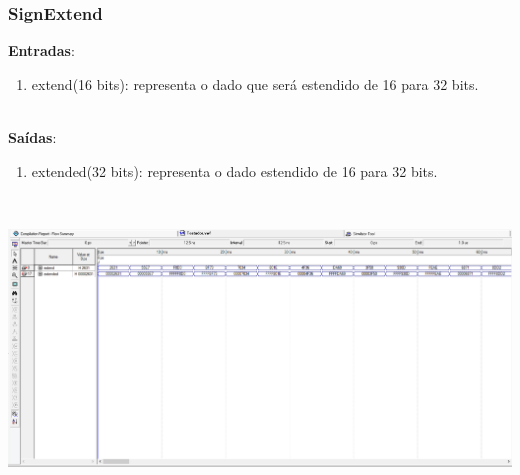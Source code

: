 \documentclass{article}
\begin{document}
    \subsubsection{SignExtend}
    \textbf{Entradas}:
    \begin{enumerate}
         \item extend(16 bits): representa o dado que será estendido de 16 para 32 bits.\\
    \end{enumerate}
    \\
    \textbf{Saídas}:
    \begin{enumerate}
        \item extended(32 bits): representa o dado estendido de 16 para 32 bits.\\
    \end{enumerate}\\
    \begin{center}
        \includegraphics[scale=0.4]{SignExtend.PNG}
    \end{center}
    \\
    \newpage
\end{document}
